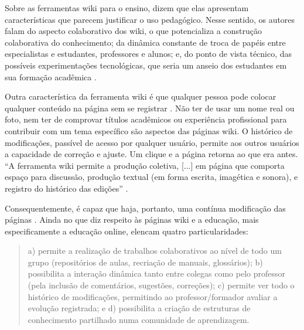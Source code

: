 \documentclass{textolivre}
\begin{document}
Sobre as ferramentas wiki para o ensino, \textcite[p. 78]{moraes2016} dizem que elas apresentam características que parecem justificar o uso pedagógico. Nesse sentido, os autores falam do aspecto colaborativo dos wiki, o que potencializa a construção colaborativa do conhecimento; da dinâmica constante de troca de papéis entre especialistas e estudantes, professores e alunos; e, do ponto de vista técnico, das possíveis experimentações tecnológicas, que seria um anseio dos estudantes em sua formação acadêmica %
\cites{cummings2009,ruth2009}[apud MORAES et. al., 2016, p. 78]{konieczny2007}.

Outra característica da ferramenta wiki é que qualquer pessoa pode colocar qualquer conteúdo na página sem se registrar \cite[p. 2]{suoranta2017}. Não ter de usar um nome real ou foto, nem ter de comprovar títulos acadêmicos ou experiência profissional para contribuir com um tema específico são aspectos das páginas wiki. O histórico de modificações, passível de acesso por qualquer usuário, permite aos outros usuários a capacidade de correção e ajuste. Um clique e a página retorna ao que era antes. “A ferramenta wiki permite a produção coletiva, [...] em página que comporta espaço para discussão, produção textual (em forma escrita, imagética e sonora), e registro do histórico das edições” \cite[p. 174]{gomes2011}. 

Consequentemente, é capaz que haja, portanto, uma contínua modificação das páginas \cite[p. 93]{zhang2009}.
Ainda no que diz respeito às páginas wiki e a educação, mais especificamente a educação online, \textcite[p. 69]{junior2017} elencam quatro particularidades:

\begin{quote}a) permite a realização de trabalhos colaborativos ao nível de todo um grupo (repositórios de aulas, recriação de manuais, glossários); b) possibilita a interação dinâmica tanto entre colegas como pelo professor (pela inclusão de comentários, sugestões, correções); c) permite ver todo o histórico de modificações, permitindo ao professor/formador avaliar a evolução registrada; e d) possibilita a criação de estruturas de conhecimento partilhado numa comunidade de aprendizagem.\end{quote}
\end{document}
